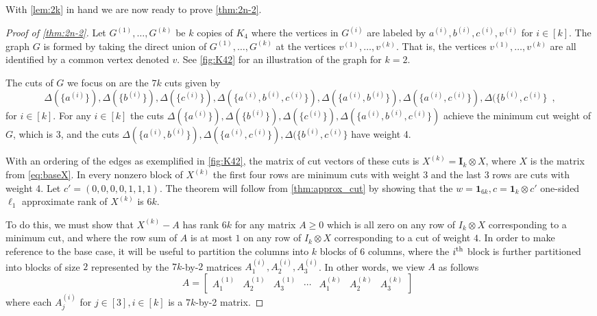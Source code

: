 \documentclass[10pt,a4paper]{article}
\newcommand{\Id}{\mathbf{I}}
\newcommand{\ith}{i^{\scriptsize \mbox{{\rm th}}}}
\newcommand{\1}{\mathbf{1}}
\theoremstyle{definition}
\begin{document}
With \cref{lem:2k} in hand we are now ready to prove \cref{thm:2n-2}.

\begin{proof}[Proof of \cref{thm:2n-2}]
Let $G^{(1)}, \ldots, G^{(k)}$ be $k$ copies of $K_4$ where the vertices in $G^{(i)}$ are labeled by $a^{(i)}, b^{(i)}, c^{(i)}, v^{(i)}$ for $i \in [k]$.
The graph $G$ is formed by taking the direct union of $G^{(1)}, \ldots, G^{(k)}$ at the vertices $v^{(1)}, \ldots, v^{(k)}$.  That is,
the vertices $v^{(1)}, \ldots, v^{(k)}$ are all identified by a common vertex denoted $v$.  See \cref{fig:K42} for an illustration of the graph
for $k=2$.

The cuts of $G$ we focus on are the $7k$ cuts given by
\[
\Delta(\{a^{(i)}\}), \Delta(\{b^{(i)}\}), \Delta(\{c^{(i)}\}), \Delta(\{a^{(i)},b^{(i)},c^{(i)}\}), \Delta(\{a^{(i)},b^{(i)}\}), \Delta(\{a^{(i)},c^{(i)}\}), \Delta(\{b^{(i)},c^{(i)}\} \enspace,
\]
for $i \in [k]$.  For any $i \in [k]$ the cuts $\Delta(\{a^{(i)}\}), \Delta(\{b^{(i)}\}), \Delta(\{c^{(i)}\}), \Delta(\{a^{(i)},b^{(i)},c^{(i)}\})$ achieve the minimum cut weight of $G$, which is 3,
and the cuts $\Delta(\{a^{(i)},b^{(i)}\}), \Delta(\{a^{(i)},c^{(i)}\}), \Delta(\{b^{(i)},c^{(i)}\}$ have weight 4.

With an ordering of the edges as exemplified in \cref{fig:K42}, the matrix of cut vectors of these cuts is $X^{(k)} = \Id_k \otimes X$,
where $X$ is the matrix from \cref{eq:baseX}.  In every nonzero block of $X^{(k)}$ the first four rows are minimum cuts with weight 3 and the last 3 rows are cuts with weight 4.
Let $c' = (0,0,0,0,1,1,1)$.  The theorem will follow from \cref{thm:approx_cut} by showing that the $w = \mathbf{1}_{6k}, c = \mathbf{1}_k \otimes c'$ one-sided $\ell_1$ approximate
rank of $X^{(k)}$ is $6k$.

To do this, we must show that $X^{(k)} - A$ has rank $6k$ for any matrix $A \ge 0$ which is all zero on any row of $I_k \otimes X$ corresponding
to a minimum cut, and where the row sum of $A$ is at most $1$ on any row of $I_k \otimes X$ corresponding to a cut of weight $4$.
In order to make reference to the base case, it will be useful to partition the columns into $k$ blocks of $6$ columns, where the $\ith$ block
is further partitioned into blocks of size $2$ represented by the $7k$-by-$2$ matrices $A_1^{(i)}, A_2^{(i)},A_3^{(i)}$.  In other words, we view
$A$ as follows
\[
A =
\begin{bmatrix}
A_1^{(1)} & A_2^{(1)} & A_3^{(1)} & \cdots & A_1^{(k)} & A_2^{(k)} & A_3^{(k)}
\end{bmatrix}
\enspace
\]
where each $A_j^{(i)}$ for $j \in [3], i \in [k]$ is a $7k$-by-2 matrix.


\end{proof}
\end{document}
